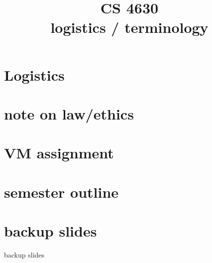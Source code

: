\graphicspath{{./figures/}}
\title{CS 4630 \\ logistics / terminology}
\date{}

\begin{frame}
    \titlepage
\end{frame}

\section{Logistics}


\section{note on law/ethics}





\section{VM assignment}



\section{semester outline}



\section{backup slides}

\begin{frame}{backup slides}
\end{frame}




